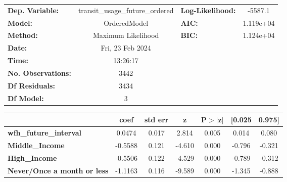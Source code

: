 \documentclass{report}
\begin{document}
\begin{center}
\begin{tabular}{lclc}
\toprule
\textbf{Dep. Variable:}                           & transit\_usage\_future\_ordered & \textbf{  Log-Likelihood:    } &   -5587.1   \\
\textbf{Model:}                                   &           OrderedModel          & \textbf{  AIC:               } & 1.119e+04   \\
\textbf{Method:}                                  &        Maximum Likelihood       & \textbf{  BIC:               } & 1.124e+04   \\
\textbf{Date:}                                    &         Fri, 23 Feb 2024        & \textbf{                     } &             \\
\textbf{Time:}                                    &             13:26:17            & \textbf{                     } &             \\
\textbf{No. Observations:}                        &                3442             & \textbf{                     } &             \\
\textbf{Df Residuals:}                            &                3434             & \textbf{                     } &             \\
\textbf{Df Model:}                                &                   3             & \textbf{                     } &             \\
\bottomrule
\end{tabular}
\begin{tabular}{lcccccc}
                                                  & \textbf{coef} & \textbf{std err} & \textbf{z} & \textbf{P$> |$z$|$} & \textbf{[0.025} & \textbf{0.975]}  \\
\midrule
\textbf{wfh\_future\_interval}                    &       0.0474  &        0.017     &     2.814  &         0.005        &        0.014    &        0.080     \\
\textbf{Middle\_Income}                           &      -0.5588  &        0.121     &    -4.610  &         0.000        &       -0.796    &       -0.321     \\
\textbf{High\_Income}                             &      -0.5506  &        0.122     &    -4.529  &         0.000        &       -0.789    &       -0.312     \\
\textbf{Never/Once a month or less}               &      -1.1163  &        0.116     &    -9.589  &         0.000        &       -1.345    &       -0.888     \\

\end{tabular}
\end{center}
\end{document}
